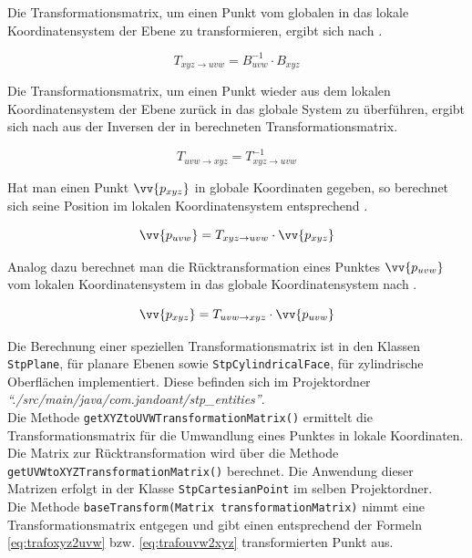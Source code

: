 Die Transformationsmatrix, um einen Punkt vom globalen in das lokale Koordinatensystem der Ebene zu transformieren, ergibt sich nach .

\begin{equation}\label{eq:matrixXYZ2UVW}
T_{xyz \rightarrow uvw} = B_{uvw}^{-1} \cdot B_{xyz}  
\end{equation}   

Die Transformationsmatrix, um einen Punkt wieder aus dem lokalen Koordinatensystem der Ebene zurück in das globale System zu überführen, ergibt sich nach  aus der Inversen der in  berechneten Transformationsmatrix.

\begin{equation}\label{eq:matrixUVW2XYZ}
T_{uvw \rightarrow xyz} = T_{xyz \rightarrow uvw}^{-1} 
\end{equation}   

Hat man einen Punkt $\vv{p_{xyz}}$ in globale Koordinaten gegeben, so berechnet sich seine Position im lokalen Koordinatensystem entsprechend . 

\begin{equation}\label{eq:trafoxyz2uvw}
\vv{p_{uvw}}=T_{xyz \rightarrow uvw} \cdot \vv{p_{xyz}}
\end{equation}

Analog dazu berechnet man die Rücktransformation eines Punktes $\vv{p_{uvw}}$ vom lokalen Koordinatensystem in das globale Koordinatensystem nach .
  
\begin{equation}\label{eq:trafouvw2xyz}
\vv{p_{xyz}}=T_{uvw \rightarrow xyz} \cdot \vv{p_{uvw}}
\end{equation}

Die Berechnung einer speziellen Transformationsmatrix ist in den Klassen \verb|StpPlane|, für planare Ebenen sowie \verb|StpCylindricalFace|, für zylindrische Oberflächen implementiert.  Diese befinden sich im Projektordner \textit{"`./src/main/java/com.jandoant/stp\_entities"'}.\\ 
Die Methode \verb|getXYZtoUVWTransformationMatrix()| ermittelt die Transformationsmatrix für die Umwandlung eines Punktes in lokale Koordinaten. Die Matrix zur Rücktransformation wird über die Methode \verb|getUVWtoXYZTransformationMatrix()| berechnet. 
Die Anwendung dieser Matrizen erfolgt in der Klasse \verb|StpCartesianPoint| im selben Projektordner.\\ 
Die Methode \verb|baseTransform(Matrix transformationMatrix)| nimmt eine Transformationsmatrix entgegen und gibt einen entsprechend der Formeln \ref{eq:trafoxyz2uvw} bzw. \ref{eq:trafouvw2xyz} transformierten Punkt aus. 

